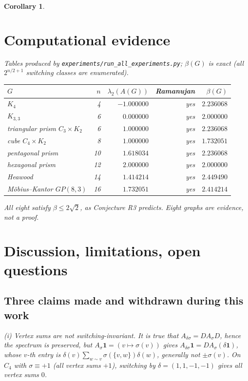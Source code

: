 \documentclass[11pt,a4paper]{article}
\theoremstyle{plain}
\newtheorem{corollary}[theorem]{Corollary}
\theoremstyle{definition}
\newcommand{\sgn}{\sigma}
\newcommand{\bdG}{A(G)}
\begin{document}
\begin{corollary}
\section{Computational evidence}

Tables produced by \texttt{experiments/run\_all\_experiments.py}; $\beta(G)$ is
exact (all $2^{n/2+1}$ switching classes are enumerated).

\begin{center}
\small
\begin{tabular}{lrrrr}
\toprule
$G$ & $n$ & $\lambda_2(\bdG)$ & Ramanujan & $\beta(G)$\\
\midrule
$K_4$ & 4 & $-1.000000$ & yes & $2.236068$\\
$K_{3,3}$ & 6 & $0.000000$ & yes & $2.000000$\\
triangular prism $C_3\times K_2$ & 6 & $1.000000$ & yes & $2.236068$\\
cube $C_4\times K_2$ & 8 & $1.000000$ & yes & $1.732051$\\
pentagonal prism & 10 & $1.618034$ & yes & $2.236068$\\
hexagonal prism & 12 & $2.000000$ & yes & $2.000000$\\
Heawood & 14 & $1.414214$ & yes & $2.449490$\\
Möbius--Kantor $GP(8,3)$ & 16 & $1.732051$ & yes & $2.414214$\\
\bottomrule
\end{tabular}
\end{center}

All eight satisfy $\beta\le2\sqrt2$, as Conjecture R3 predicts. Eight graphs
are evidence, not a proof.

\section{Discussion, limitations, open questions}

\subsection*{Three claims made and withdrawn during this work}

\emph{(i) Vertex sums are not switching-invariant.} It is true that
$A_{\delta\sgn}=DA_{\sgn}D$, hence the spectrum is preserved, but
$A_{\sgn}\mathbf 1=(v\mapsto\sgn(v))$ gives
$A_{\delta\sgn}\mathbf 1=DA_{\sgn}(\delta\mathbf 1)$, whose $v$-th entry is
$\delta(v)\sum_{w\sim v}\sgn(\{v,w\})\delta(w)$, generally not $\pm\sgn(v)$.
On $C_4$ with $\sgn\equiv+1$ (all vertex sums $+1$), switching by
$\delta=(1,1,-1,-1)$ gives all vertex sums $0$.


\end{corollary}
\end{document}
